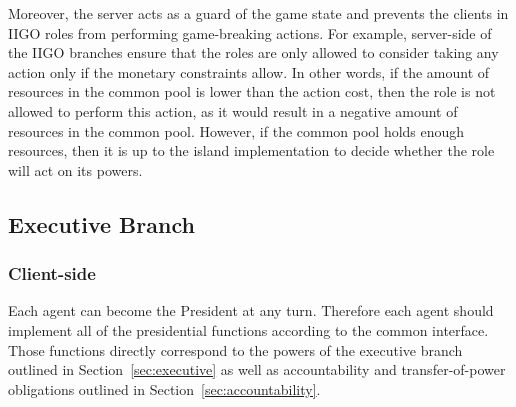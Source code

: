 Moreover, the server acts as a guard of the game state and prevents the clients in IIGO roles from performing game-breaking actions. For example, server-side of the IIGO branches ensure that the roles are only allowed to consider taking any action only if the monetary constraints allow. In other words, if the amount of resources in the common pool is lower than the action cost, then the role is not allowed to perform this action, as it would result in a negative amount of resources in the common pool. However, if the common pool holds enough resources, then it is up to the island implementation to decide whether the role will act on its powers.


\subsection{Executive Branch}


\subsubsection{Client-side}
\label{sub:president:client-side}
Each agent can become the President at any turn. Therefore each agent should implement all of the presidential functions according to the common interface. Those functions directly correspond to the powers of the executive branch outlined in Section~\ref{sec:executive} as well as accountability and transfer-of-power obligations outlined in Section~\ref{sec:accountability}. 

